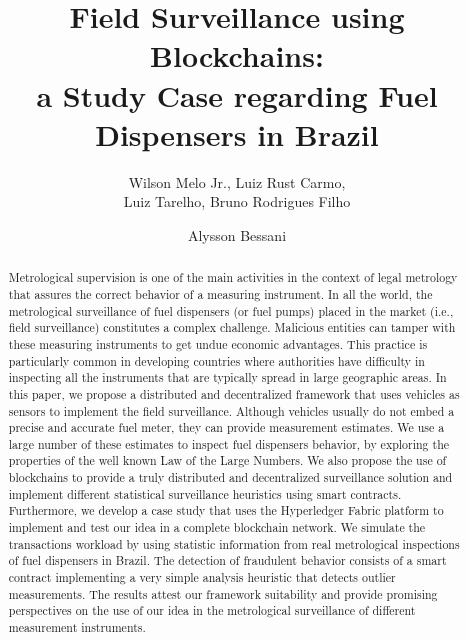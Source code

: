 \documentclass[sigplan]{acmart}
\begin{document}
\title{Field Surveillance using Blockchains: \\a Study Case regarding Fuel Dispensers in Brazil}

\author{Wilson Melo Jr., Luiz Rust Carmo, \\Luiz Tarelho, Bruno Rodrigues Filho}

\author{Alysson Bessani}



\renewcommand{\shortauthors}{W. Melo Jr et al.}

\begin{abstract}
Metrological supervision is one of the main activities in the context of legal metrology that assures the correct behavior of a measuring instrument.
In all the world, the metrological surveillance of fuel dispensers (or fuel pumps) placed in the market (i.e., field surveillance) constitutes a complex challenge.
Malicious entities can tamper with these measuring instruments to get undue economic advantages.
This practice is particularly common in developing countries where authorities have difficulty in inspecting all the instruments that are typically spread in large geographic areas.   
In this paper, we propose a distributed and decentralized framework that uses vehicles as sensors to implement the field surveillance.
Although vehicles usually do not embed a precise and accurate fuel meter, they can provide measurement estimates.
We use a large number of these estimates to inspect fuel dispensers behavior, by exploring the properties of the well known Law of the Large Numbers.
We also propose the use of blockchains to provide a truly distributed and decentralized surveillance solution and implement different statistical surveillance heuristics using smart contracts.
Furthermore, we develop a case study that uses the Hyperledger Fabric platform to implement and test our idea in a complete blockchain network.
We simulate the transactions workload by using statistic information from real metrological inspections of fuel dispensers in Brazil.
The detection of fraudulent behavior consists of a smart contract implementing a very simple analysis heuristic that detects outlier measurements.
The results attest our framework suitability and provide promising perspectives on the use of our idea in the metrological surveillance of different measurement instruments.
\end{abstract}
\end{document}

